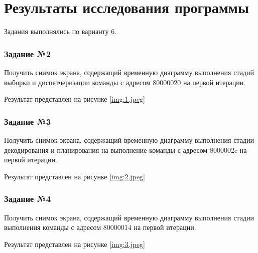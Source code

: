 \chapter*{Результаты исследования программы}
Задания выполнялись по варианту 6.


\subsection*{Задание №2}
Получить снимок экрана, содержащий временную диаграмму выполнения стадий выборки и диспетчеризации команды с адресом 80000020 на первой итерации.

Результат представлен на рисунке \ref{img:1.jpeg}
\clearpage

\subsection*{Задание №3}

Получить снимок экрана, содержащий временную диаграмму выполнения стадии декодирования и планирования на выполнение команды с адресом 8000002c на первой итерации.

Результат представлен на рисунке \ref{img:2.jpeg}
\clearpage

\subsection*{Задание №4}

Получить снимок экрана, содержащий временную диаграмму выполнения стадии выполнения команды с адресом 80000014 на первой итерации.

Результат представлен на рисунке \ref{img:3.jpeg}
\clearpage